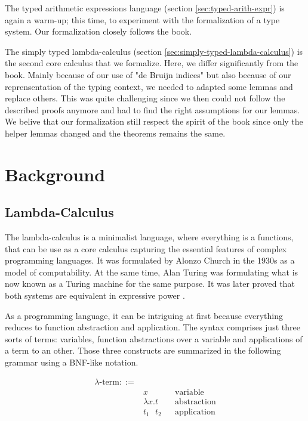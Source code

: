 \documentclass[a4paper, oneside, 12pt, titlepage]{article}
\begin{document}
The typed arithmetic expressions language (section \ref{sec:typed-arith-expr}) is again a warm-up;
this time, to experiment with the formalization of a type system. Our formalization closely follows
the book.

The simply typed lambda-calculus (section \ref{sec:simply-typed-lambda-calculus}) is the second core
calculus that we formalize. Here, we differ significantly from the book. Mainly because of our use
of "de Bruijn indices" but also because of our reprensentation of the typing context, we needed to
adapted some lemmas and replace others. This was quite challenging since we then could not follow
the described proofs anymore and had to find the right assumptions for our lemmas. We belive that
our formalization still respect the spirit of the book since only the helper lemmas changed and the
theorems remains the same.

\section{Background}
\label{sec:background}

\subsection{Lambda-Calculus}

The lambda-calculus is a minimalist language, where everything is a functions, that can be use as a
core calculus capturing the essential features of complex programming languages. It was formulated
by Alonzo Church \cite{???} in the 1930s as a model of computability. At the same time, Alan Turing
was formulating what is now known as a Turing machine \cite{???} for the same purpose. It was later
proved that both systems are equivalent in expressive power \cite{???}.

As a programming language, it can be intriguing at first because everything reduces to function
abstraction and application. The syntax comprises just three sorts of terms: variables, function
abstractions over a variable and applications of a term to an other. Those three constructs are
summarized in the following grammar using a BNF-like notation.

\begin{align*}
  \lambda\text{-term} ::= & \\
    & x && \text{variable} \\
    & \lambda x. t && \text{abstraction} \\
    & t_1 \text{ } t_2 && \text{application}
\end{align*}
\end{document}
